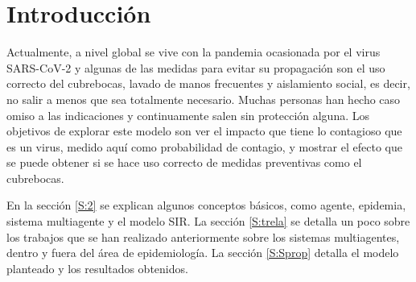 \documentclass[final,6p,times,twocolumn]{elsarticle}
\begin{document}
	
	\section{Introducción}
	Actualmente, a nivel global se vive con la pandemia ocasionada por el virus SARS-CoV-2 y algunas de las medidas para evitar su propagación son el uso correcto del cubrebocas, lavado de manos frecuentes y aislamiento social, es decir, no salir a menos que sea totalmente necesario. Muchas personas han hecho caso omiso a las indicaciones y continuamente salen sin protección alguna. Los objetivos de explorar este modelo son ver el impacto que tiene lo contagioso que es un virus, medido aquí como probabilidad de contagio, y mostrar el efecto que se puede obtener si se hace uso correcto de medidas preventivas como el cubrebocas. 
	
	En la sección \ref{S:2} se explican algunos conceptos básicos, como agente, epidemia, sistema multiagente y el modelo SIR. La sección \ref{S:trela} se detalla un poco sobre los trabajos que se han realizado anteriormente sobre los sistemas multiagentes, dentro y fuera del área de epidemiología. La sección \ref{S:Sprop} detalla el modelo planteado y los resultados obtenidos.
	
	\label{S:1}
	
	
	
	
	
	
	
	
\end{document}
